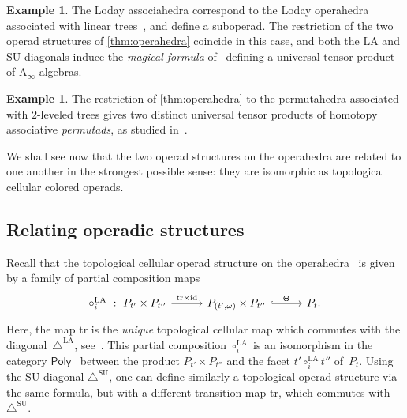 \documentclass{amsart}
\theoremstyle{definition}
\newtheorem{example}[theorem]{Example}
\newcommand{\SU}{\mathrm{SU}}
\newcommand{\LA}{\mathrm{LA}}
\newcommand{\SUD}{\triangle^{\mathrm{SU}}}
\newcommand{\LAD}{\triangle^{\mathrm{LA}}}
\newcommand{\PolySub}{\mathsf{Poly}}
\newcommand{\Ainf}{\ensuremath{\mathrm{A}_\infty}}
\newcommand{\tr}{\mathrm{tr}}
\newcommand{\id}{\mathrm{id}}
\begin{document}
\begin{example}
The Loday associahedra correspond to the Loday operahedra associated with linear trees~\cite[Sect. 2.2]{LaplanteAnfossi}, and define a suboperad.
The restriction of the two operad structures of \cref{thm:operahedra} coincide in this case, and both the $\LA$ and $\SU$ diagonals induce the \emph{magical formula} of~\cite{MarklShnider, MasudaThomasTonksVallette, SaneblidzeUmble-comparingDiagonals} defining a universal tensor product of $\Ainf$-algebras. 
\end{example}

\begin{example}
The restriction of \cref{thm:operahedra} to the permutahedra associated with $2$-leveled trees gives two distinct universal tensor products of homotopy associative \emph{permutads}, as studied in~\cite{LodayRonco-permutads,Markl}.
\end{example}

We shall see now that the two operad structures on the operahedra are related to one another in the strongest possible sense: they are isomorphic as topological cellular colored operads.


\subsection{Relating operadic structures} 
\label{subsec:iso-top-operads}

Recall that the topological cellular operad structure on the operahedra~\cite[Def.~4.17]{LaplanteAnfossi} is given by a family of partial composition maps 
\[
\vcenter{\hbox{
\begin{tikzcd}[column sep=1cm]
\circ_i^{\LA}\ : \ P_{t'}\times P_{t''}
\arrow[r,  "\tr\times \id"]
& P_{(t',\omega)}\times P_{t''}
 \arrow[r,hookrightarrow, "\Theta"]
&
P_t .
\end{tikzcd}
}}  \]
Here, the map $\tr$ is the \emph{unique} topological cellular map which commutes with the diagonal~$\LAD$, see~\cite[Prop.~7]{MasudaThomasTonksVallette}. 
This partial composition $\circ_i^\LA$ is an isomorphism in the category $\PolySub$~\cite[Def.~4.13]{LaplanteAnfossi} between the product $P_{t'}\times P_{t''}$ and the facet $t' \circ_i^\LA t''$ of~$P_t$.
Using the $\SU$ diagonal $\SUD$, one can define similarly a topological operad structure via the same formula, but with a different transition map $\tr$, which commutes with $\SUD$.
\end{document}
